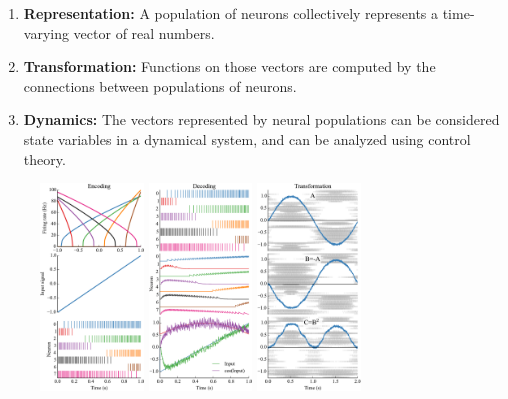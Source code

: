 \documentclass{frontiersSCNS}
\begin{document}
\begin{enumerate}
  \item \textbf{Representation:} A population of neurons
    collectively represents a time-varying vector of real numbers.
  \item \textbf{Transformation:} Functions on those vectors
    are computed by the connections between populations of neurons.
  \item \textbf{Dynamics:} The vectors represented
    by neural populations can be considered state variables
    in a dynamical system, and can be analyzed using control theory.
\end{enumerate}

\begin{figure}
\begin{center}
  \includegraphics[width=0.245\textwidth]{nef_summary_enc}
  \includegraphics[width=0.245\textwidth]{nef_summary_dec}
  \includegraphics[width=0.245\textwidth]{nef_summary_trans}

\end{center}
\end{figure}
\end{document}
